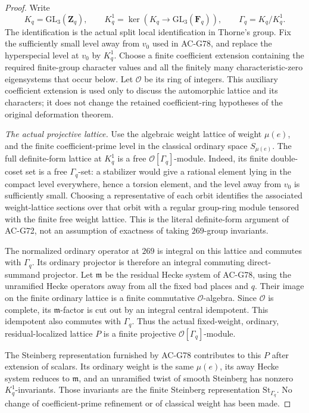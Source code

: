 \begin{proof}
Write
\[
 K_q=\mathrm{GL}_3(\mathbf Z_q),\qquad
 K_q^1=\ker(K_q\longrightarrow\mathrm{GL}_3(\mathbf F_q)),
 \qquad \Gamma_q=K_q/K_q^1.
\]
The identification is the actual split local identification in
Thorne's group.  Fix the sufficiently small level away from
\(v_0\) used in AC-G78, and replace the hyperspecial level at
\(v_0\) by \(K_q^1\).
Choose a finite coefficient extension containing the required
finite-group character values and all the finitely many
characteristic-zero eigensystems that occur below.
Let \(\mathcal O\) be its ring of integers.
This auxiliary coefficient extension is used only to discuss
the automorphic lattice and its characters; it does not change
the retained coefficient-ring hypotheses of the original
deformation theorem.

\emph{The actual projective lattice.}
Use the algebraic weight lattice of weight \(\mu(e)\), and the
finite coefficient-prime level in the classical ordinary space
\(S_{\mu(e)}\).
The full definite-form lattice at \(K_q^1\) is a free
\(\mathcal O[\Gamma_q]\)-module.
Indeed, its finite double-coset set is a free \(\Gamma_q\)-set:
a stabilizer would give a rational element lying in the compact
level everywhere, hence a torsion element, and the level away
from \(v_0\) is sufficiently small.
Choosing a representative of each orbit identifies the associated
weight-lattice sections over that orbit with a regular group-ring
module tensored with the finite free weight lattice.
This is the literal definite-form argument of AC-G72, not an
assumption of exactness of taking \(269\)-group invariants.

The normalized ordinary operator at \(269\) is integral on this
lattice and commutes with \(\Gamma_q\).
Its ordinary projector is therefore an integral commuting
direct-summand projector.
Let \(\mathfrak m\) be the residual Hecke system of AC-G78,
using the unramified Hecke operators away from all the fixed bad
places and \(q\).
Their image on the finite ordinary lattice is a finite commutative
\(\mathcal O\)-algebra.  Since \(\mathcal O\) is complete, its
\(\mathfrak m\)-factor is cut out by an integral central idempotent.
This idempotent also commutes with \(\Gamma_q\).
Thus the actual fixed-weight, ordinary, residual-localized lattice
\(P\) is a finite projective \(\mathcal O[\Gamma_q]\)-module.

The Steinberg representation furnished by AC-G78 contributes to
this \(P\) after extension of scalars.
Its ordinary weight is the same \(\mu(e)\), its away Hecke system
reduces to \(\mathfrak m\), and an unramified twist of smooth
Steinberg has nonzero \(K_q^1\)-invariants.
Those invariants are the finite Steinberg representation
\(\mathrm{St}_{\Gamma_q}\).
No change of coefficient-prime refinement or of classical weight
has been made.


\end{proof}

